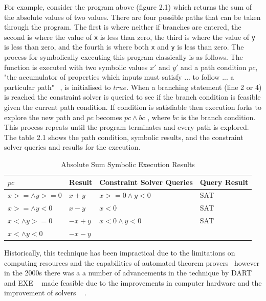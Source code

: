 \documentclass[]{final_report}
\begin{document}
For example, consider the program above (figure 2.1) which returns the sum of the absolute values of two values. There are four possible paths that can be taken through the program. The first is where neither if branches are entered, the second is where the value of \lstinline{x} is less than zero, the third is where the value of \lstinline{y} is less than zero, and the fourth is where both \lstinline{x} and \lstinline{y} is less than zero. The process for symbolically executing this program classically is as follows. The function is executed with two symbolic values $x'$ and $y'$ and a path condition $pc$, "the accumulator of properties which inputs must satisfy ... to follow ... a particular path" ~\cite{king1976symbolic}, is initialised to $true$. When a branching statement (line 2 or 4) is reached the constraint solver is queried to see if the branch condition is feasible given the current path condition. If condition is satisfiable then execution forks to explore the new path and $pc$ becomes $pc \land bc$ , where $bc$ is the branch condition. This process repeats until the program terminates and every path is explored. The table 2.1 shows the path condition, symbolic results, and the constraint solver queries and results for the execution.

\begin{table}[]
\centering
\caption{Absolute Sum Symbolic Execution Results}
\label{abs-sum-se-table}
\begin{tabular}{|l|l|l|l|}
\hline
$pc$                & Result  & Constraint Solver Queries & Query Result \\ \hline
$x >= \land y >= 0$ & $x+y$   & $x >=0 \land y < 0 $      & SAT          \\ \hline
$x >= \land y < 0$  & $x - y$ & $x <0 $                   & SAT          \\ \hline
$x < \land y >= 0$  & $-x+y$  & $x<0 \land y < 0 $        & SAT          \\ \hline
$x < \land y < 0$   & $-x-y$  &                           &              \\ \hline
\end{tabular}
\end{table}

Historically, this technique has been impractical due to the limitations on computing resources and the capabilities of automated theorem provers~\cite{king1976symbolic} however in the 2000s there was a a number of advancements in the technique by DART~\cite{godefroid2005dart} and EXE ~\cite{cadar2008exe} made feasible due to the improvements in computer hardware and the improvement of solvers ~\cite{de2011satisfiability} .
\end{document}
